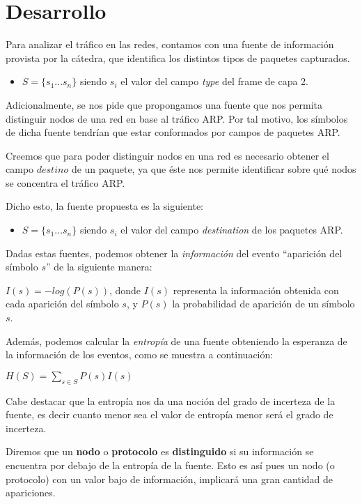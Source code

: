 \section{Desarrollo}

Para analizar el tráfico en las redes, contamos con una fuente de información provista por la cátedra, que identifica los distintos tipos de paquetes capturados.

\begin{itemize}
\item $S=\{s_1 ... s_n\}$ siendo $s_i$ el valor del campo \textit{type} del frame de capa 2.
\end{itemize}

Adicionalmente, se nos pide que propongamos una fuente que nos permita distinguir nodos de una red en base al tráfico ARP. Por tal motivo, los símbolos de dicha fuente tendrían que estar conformados por campos de paquetes ARP.

Creemos que para poder distinguir nodos en una red es necesario obtener el campo $destino$ de un paquete, ya que éste nos permite identificar sobre qué nodos se concentra el tráfico ARP.

Dicho esto, la fuente propuesta es la siguiente:

\begin{itemize}
\item $S=\{s_1 ... s_n\}$ siendo $s_i$ el valor del campo \textit{destination} de los paquetes ARP.
\end{itemize}


Dadas estas fuentes, podemos obtener la \textit{información} del evento ``aparición del símbolo $s$'' de la siguiente manera:

$I(s) = -log(P(s))$, donde $I(s)$ representa la información obtenida con cada aparición del símbolo $s$, y $P(s)$ la probabilidad de aparición de un símbolo $s$.

Además, podemos calcular la \textit{entropía} de una fuente obteniendo la esperanza de la información de los eventos, como se muestra a continuación:

$H(S) = \sum_{s \in S} P(s) I(s)$

Cabe destacar que la entropía nos da una noción del grado de incerteza de la fuente, es decir cuanto menor sea el valor de entropía menor será el grado de incerteza. 

Diremos que un \textbf{nodo} o \textbf{protocolo} es \textbf{distinguido} si su información se encuentra por debajo de la entropía de la fuente. Esto es así pues un nodo (o protocolo) con un valor bajo de información, implicará una gran cantidad de apariciones.


